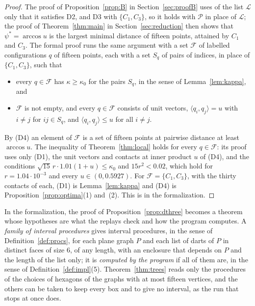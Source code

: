 \documentclass[12pt]{amsart}
\theoremstyle{definition}
\theoremstyle{plain}
\theoremstyle{definition}
\newcommand{\psis}{\psi^{*}}
\newcommand{\CI}{C_1}
\newcommand{\CIII}{C_3}
\begin{document}
\begin{proof}
The proof of Proposition~\ref{prop:B} in Section~\ref{sec:proofB} uses of the list $\mathcal L$ only that it satisfies D2, and D3 with $\{\CI,\CIII\}$, so it holds with $\mathcal P$ in place of $\mathcal L$; the proof of Theorem~\ref{thm:main} in Section~\ref{sec:reduction} then shows that $\psis=\arccos u$ is the largest minimal distance of fifteen points, attained by $\CI$ and $\CIII$. The formal proof runs the same argument with a set $\mathcal F$ of labelled configurations $q$ of fifteen points, each with a set $S_q$ of pairs of indices, in place of $\{\CI,\CIII\}$, such that
\begin{itemize}
\item[(D1)] every $q\in\mathcal F$ has $\kappa\ge\kappa_0$ for the pairs $S_q$, in the sense of Lemma~\ref{lem:kappa}, and
\item[(D4)] $\mathcal F$ is not empty, and every $q\in\mathcal F$ consists of unit vectors, $\langle q_i,q_j\rangle=u$ with $i\ne j$ for $ij\in S_q$, and $\langle q_i,q_j\rangle\le u$ for all $i\ne j$.
\end{itemize}
By (D4) an element of $\mathcal F$ is a set of fifteen points at pairwise distance at least $\arccos u$. The inequality of Theorem~\ref{thm:local} holds for every $q\in\mathcal F$: its proof uses only (D1), the unit vectors and contacts at inner product $u$ of (D4), and the conditions $\sqrt{15}\,r\cdot1.01(1+u)\le\kappa_0$ and $15r^2<0.02$, which hold for $r=1.04\cdot10^{-3}$ and every $u\in(0,0.5927)$. For $\mathcal F=\{\CI,\CIII\}$, with the thirty contacts of each, (D1) is Lemma~\ref{lem:kappa} and (D4) is Proposition~\ref{prop:optima}(1) and~(2). This is  in the formalization.
\end{proof}

In the formalization, the proof of Proposition~\ref{prop:dthree} becomes a theorem whose hypotheses are what the replays check and how the program computes. A \emph{family of interval procedures} gives interval procedures, in the sense of Definition~\ref{def:procs}, for each plane graph $P$ and each list of darts of $P$ in distinct faces of size $6$, of any length, with an enclosure that depends on $P$ and the length of the list only; it is \emph{computed by the program} if all of them are, in the sense of Definition~\ref{def:impl}(5). Theorem~\ref{thm:trees} reads only the procedures of the choices of hexagons of the graphs with at most fifteen vertices, and the others can be taken to keep every box and to give no interval, as the run that stops at once does.
\end{document}
